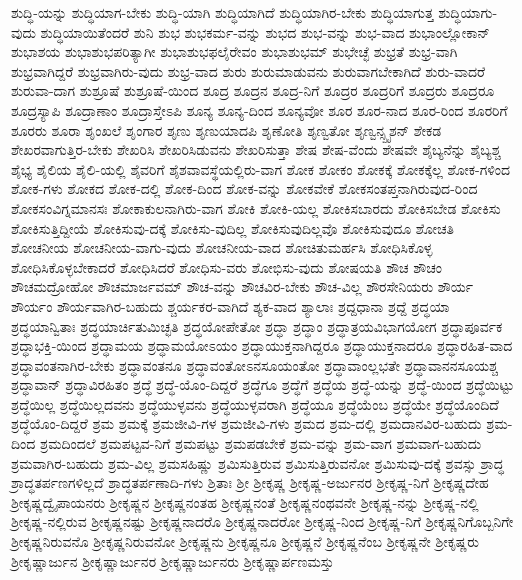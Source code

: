 {ಶುದ್ಧಿ-ಯನ್ನು
ಶುದ್ಧಿಯಾಗ-ಬೇಕು
ಶುದ್ಧಿ-ಯಾಗಿ
ಶುದ್ಧಿಯಾಗಿದೆ
ಶುದ್ಧಿಯಾಗಿರ-ಬೇಕು
ಶುದ್ಧಿಯಾಗುತ್ತ
ಶುದ್ಧಿಯಾಗು-ವುದು
ಶುದ್ಧಿಯಾಯಿತೆಂದರೆ
ಶುನಿ
ಶುಭ
ಶುಭಕರ್ಮ-ವನ್ನು
ಶುಭದ
ಶುಭ-ವನ್ನು
ಶುಭ-ವಾದ
ಶುಭಾಂಲ್ಲೋಕಾನ್
ಶುಭಾಶಯ
ಶುಭಾಶುಭಪರಿತ್ಯಾಗೀ
ಶುಭಾಶುಭಫಲೈರೇವಂ
ಶುಭಾಶುಭಮ್
ಶುಭೇಚ್ಛೆ
ಶುಭ್ರತೆ
ಶುಭ್ರ-ವಾಗಿ
ಶುಭ್ರವಾಗಿದ್ದರೆ
ಶುಭ್ರವಾಗಿರು-ವುದು
ಶುಭ್ರ-ವಾದ
ಶುರು
ಶುರುಮಾಡುವನು
ಶುರುವಾಗಬೇಕಾಗಿದೆ
ಶುರು-ವಾದರೆ
ಶುರುವಾ-ದಾಗ
ಶುಶ್ರೂಷೆ
ಶುಶ್ರೂಷೆ-ಯಿಂದ
ಶೂದ್ರ
ಶೂದ್ರನ
ಶೂದ್ರ-ನಿಗೆ
ಶೂದ್ರರ
ಶೂದ್ರರಿಗೆ
ಶೂದ್ರರು
ಶೂದ್ರರೂ
ಶೂದ್ರಸ್ಯಾಪಿ
ಶೂದ್ರಾಣಾಂ
ಶೂದ್ರಾಸ್ತೇಽಪಿ
ಶೂನ್ಯ
ಶೂನ್ಯ-ದಿಂದ
ಶೂನ್ಯವೋ
ಶೂರ
ಶೂರ-ನಾದ
ಶೂರ-ರಿಂದ
ಶೂರರಿಗೆ
ಶೂರರು
ಶೂರಾ
ಶೃಂಖಲೆ
ಶೃಂಗಾರ
ಶೃಣು
ಶೃಣುಯಾದಪಿ
ಶೃಣೋತಿ
ಶೃಣ್ವತೋ
ಶೃಣ್ವನ್ಸ್ಪೃಶನ್
ಶೇಕಡ
ಶೇಖರವಾಗುತ್ತಿರ-ಬೇಕು
ಶೇಖರಿಸಿ
ಶೇಖರಿಸಿಡುವನು
ಶೇಖರಿಸುತ್ತಾ
ಶೇಷ
ಶೇಷ-ವೆಂದು
ಶೇಷವೇ
ಶೈಬ್ಯನೆನ್ನು
ಶೈಬ್ಯಶ್ಚ
ಶೈಭ್ಯ
ಶೈಲಿಯ
ಶೈಲಿ-ಯಲ್ಲಿ
ಶೈವರಿಗೆ
ಶೈಶವಾವಸ್ಥೆಯಲ್ಲಿರು-ವಾಗ
ಶೋಕ
ಶೋಕಂ
ಶೋಕಕ್ಕೆ
ಶೋಕಕ್ಕೆಲ್ಲ
ಶೋಕ-ಗಳಿಂದ
ಶೋಕ-ಗಳು
ಶೋಕದ
ಶೋಕ-ದಲ್ಲಿ
ಶೋಕ-ದಿಂದ
ಶೋಕ-ವನ್ನು
ಶೋಕವೇಕೆ
ಶೋಕಸಂತಪ್ತನಾಗಿರುವುದ-ರಿಂದ
ಶೋಕಸಂವಿಗ್ನಮಾನಸಃ
ಶೋಕಾಕುಲನಾಗಿರು-ವಾಗ
ಶೋಕಿ
ಶೋಕಿ-ಯಲ್ಲ
ಶೋಕಿಸಬಾರದು
ಶೋಕಿಸಬೇಡ
ಶೋಕಿಸು
ಶೋಕಿಸುತ್ತಿದ್ದೀಯೆ
ಶೋಕಿಸುವು-ದಕ್ಕೆ
ಶೋಕಿಸು-ವುದಿಲ್ಲ
ಶೋಕಿಸುವುದಿಲ್ಲವೊ
ಶೋಕಿಸುವುದೂ
ಶೋಚತಿ
ಶೋಚನೀಯ
ಶೋಚನೀಯ-ವಾಗು-ವುದು
ಶೋಚನೀಯ-ವಾದ
ಶೋಚಿತುಮರ್ಹಸಿ
ಶೋಧಿಸಿಕೊಳ್ಳ
ಶೋಧಿಸಿಕೊಳ್ಳಬೇಕಾದರೆ
ಶೋಧಿಸಿದರೆ
ಶೋಧಿಸು-ವರು
ಶೋಭಿಸು-ವುದು
ಶೋಷಯತಿ
ಶೌಚ
ಶೌಚಂ
ಶೌಚಮದ್ರೋಹೋ
ಶೌಚಮಾರ್ಜವಮ್
ಶೌಚ-ವನ್ನು
ಶೌಚವಿರ-ಬೇಕು
ಶೌಚ-ವಿಲ್ಲ
ಶೌರಸೇನಿಯರು
ಶೌರ್ಯ
ಶೌರ್ಯಂ
ಶೌರ್ಯವಾಗಿರ-ಬಹುದು
ಶ್ಚರ್ಯಕರ-ವಾಗಿದೆ
ಶ್ಯಕ-ವಾದ
ಶ್ಯಾಲಾಃ
ಶ್ರದ್ದಧಾನಾ
ಶ್ರದ್ದೆ
ಶ್ರದ್ಧಯಾ
ಶ್ರದ್ಧಯಾನ್ವಿತಾಃ
ಶ್ರದ್ಧಯಾರ್ಚಿತುಮಿಚ್ಛತಿ
ಶ್ರದ್ಧಯೋಪೇತೋ
ಶ್ರದ್ಧಾ
ಶ್ರದ್ಧಾಂ
ಶ್ರದ್ಧಾತ್ರಯವಿಭಾಗಯೋಗ
ಶ್ರದ್ಧಾಪೂರ್ವಕ
ಶ್ರದ್ಧಾಭಕ್ತಿ-ಯಿಂದ
ಶ್ರದ್ಧಾಮಯ
ಶ್ರದ್ಧಾಮಯೋಽಯಂ
ಶ್ರದ್ಧಾಯುಕ್ತನಾಗಿದ್ದರೂ
ಶ್ರದ್ಧಾಯುಕ್ತನಾದರೂ
ಶ್ರದ್ಧಾರಹಿತ-ವಾದ
ಶ್ರದ್ಧಾವಂತನಾಗಿರ-ಬೇಕು
ಶ್ರದ್ಧಾವಂತನೂ
ಶ್ರದ್ಧಾವಂತೋಽನಸೂಯಂತೋ
ಶ್ರದ್ಧಾವಾಂಲ್ಲಭತೇ
ಶ್ರದ್ಧಾವಾನನಸೂಯಶ್ಚ
ಶ್ರದ್ಧಾವಾನ್
ಶ್ರದ್ಧಾವಿರಹಿತಂ
ಶ್ರದ್ಧೆ
ಶ್ರದ್ಧೆ-ಯೊಂ-ದಿದ್ದರೆ
ಶ್ರದ್ಧೆಗೂ
ಶ್ರದ್ಧೆಗೆ
ಶ್ರದ್ಧೆಯ
ಶ್ರದ್ಧೆ-ಯನ್ನು
ಶ್ರದ್ಧೆ-ಯಿಂದ
ಶ್ರದ್ಧೆಯಿಟ್ಟು
ಶ್ರದ್ಧೆಯಿಲ್ಲ
ಶ್ರದ್ಧೆಯಿಲ್ಲದವನು
ಶ್ರದ್ಧೆಯುಳ್ಳವನು
ಶ್ರದ್ಧೆಯುಳ್ಳವರಾಗಿ
ಶ್ರದ್ಧೆಯೂ
ಶ್ರದ್ಧೆಯೆಂಬ
ಶ್ರದ್ಧೆಯೇ
ಶ್ರದ್ಧೆಯೊಂದಿದೆ
ಶ್ರದ್ಧೆಯೊಂ-ದಿದ್ದರೆ
ಶ್ರಮ
ಶ್ರಮಕ್ಕೆ
ಶ್ರಮಜೀವಿ-ಗಳ
ಶ್ರಮಜೀವಿ-ಗಳು
ಶ್ರಮದ
ಶ್ರಮ-ದಲ್ಲಿ
ಶ್ರಮದಾನವಿರ-ಬಹುದು
ಶ್ರಮ-ದಿಂದ
ಶ್ರಮದಿಂದಲೆ
ಶ್ರಮಪಟ್ಟವ-ನಿಗೆ
ಶ್ರಮಪಟ್ಟು
ಶ್ರಮಪಡಬೇಕೆ
ಶ್ರಮ-ವನ್ನು
ಶ್ರಮ-ವಾಗ
ಶ್ರಮವಾಗ-ಬಹುದು
ಶ್ರಮವಾಗಿರ-ಬಹುದು
ಶ್ರಮ-ವಿಲ್ಲ
ಶ್ರಮಸಹಿಷ್ಣು
ಶ್ರಮಿಸುತ್ತಿರುವ
ಶ್ರಮಿಸುತ್ತಿರುವನೋ
ಶ್ರಮಿಸುವು-ದಕ್ಕೆ
ಶ್ರವಸ್ಸು
ಶ್ರಾದ್ಧ
ಶ್ರಾದ್ಧತರ್ಪಣಗಳಿಲ್ಲದೆ
ಶ್ರಾದ್ಧತರ್ಪಣಾದಿ-ಗಳು
ಶ್ರಿತಾಃ
ಶ್ರೀ
ಶ್ರೀಕೃಷ್ಣ
ಶ್ರೀಕೃಷ್ಣ-ಅರ್ಜುನರ
ಶ್ರೀಕೃಷ್ಣ-ನಿಗೆ
ಶ್ರೀಕೃಷ್ಣದೇಹ
ಶ್ರೀಕೃಷ್ಣದ್ವೈಪಾಯನರು
ಶ್ರೀಕೃಷ್ಣನ
ಶ್ರೀಕೃಷ್ಣನಂತಹ
ಶ್ರೀಕೃಷ್ಣನಂತೆ
ಶ್ರೀಕೃಷ್ಣನಂಥವನೇ
ಶ್ರೀಕೃಷ್ಣ-ನನ್ನು
ಶ್ರೀಕೃಷ್ಣ-ನಲ್ಲಿ
ಶ್ರೀಕೃಷ್ಣ-ನಲ್ಲಿರುವ
ಶ್ರೀಕೃಷ್ಣನಷ್ಟು
ಶ್ರೀಕೃಷ್ಣನಾದರೊ
ಶ್ರೀಕೃಷ್ಣನಾದರೋ
ಶ್ರೀಕೃಷ್ಣ-ನಿಂದ
ಶ್ರೀಕೃಷ್ಣ-ನಿಗೆ
ಶ್ರೀಕೃಷ್ಣನಿಗೊಬ್ಬನಿಗೇ
ಶ್ರೀಕೃಷ್ಣನಿರುವನೊ
ಶ್ರೀಕೃಷ್ಣನಿರುವನೋ
ಶ್ರೀಕೃಷ್ಣನು
ಶ್ರೀಕೃಷ್ಣನೂ
ಶ್ರೀಕೃಷ್ಣನೆ
ಶ್ರೀಕೃಷ್ಣನೆಂಬ
ಶ್ರೀಕೃಷ್ಣನೇ
ಶ್ರೀಕೃಷ್ಣರು
ಶ್ರೀಕೃಷ್ಣಾರ್ಜುನ
ಶ್ರೀಕೃಷ್ಣಾರ್ಜುನರ
ಶ್ರೀಕೃಷ್ಣಾರ್ಜುನರು
ಶ್ರೀಕೃಷ್ಣಾರ್ಪಣಮಸ್ತು
}
